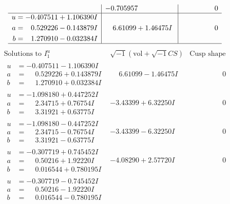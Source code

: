 \documentclass[1p]{elsarticle_modified}
\theoremstyle{definition}
\newcommand{\I}{\sqrt{-1}}
\begin{document}
$$\begin{array}{c|c|c}
 & -0.705957\phantom{ +0.000000I} & \phantom{-0.000000 } 0 \\ \hline\begin{aligned}
u &= -0.407511 + 1.106390 I \\
a &= \phantom{-}0.529226 - 0.143879 I \\
b &= \phantom{-}1.270910 - 0.032384 I\end{aligned}
 & \phantom{-}6.61099 + 1.46475 I & \phantom{-0.000000 } 0\\
 \hline 
 \end{array}$$\newpage$$\begin{array}{c|c|c}  
\text{Solutions to }I^u_{1}& \I (\text{vol} + \sqrt{-1}CS) & \text{Cusp shape}\\
 \hline 
\begin{aligned}
u &= -0.407511 - 1.106390 I \\
a &= \phantom{-}0.529226 + 0.143879 I \\
b &= \phantom{-}1.270910 + 0.032384 I\end{aligned}
 & \phantom{-}6.61099 - 1.46475 I & \phantom{-0.000000 } 0 \\ \hline\begin{aligned}
u &= -1.098180 + 0.447252 I \\
a &= \phantom{-}2.34715 + 0.76754 I \\
b &= \phantom{-}3.31921 + 0.63775 I\end{aligned}
 & -3.43399 + 6.32250 I & \phantom{-0.000000 } 0 \\ \hline\begin{aligned}
u &= -1.098180 - 0.447252 I \\
a &= \phantom{-}2.34715 - 0.76754 I \\
b &= \phantom{-}3.31921 - 0.63775 I\end{aligned}
 & -3.43399 - 6.32250 I & \phantom{-0.000000 } 0 \\ \hline\begin{aligned}
u &= -0.307719 + 0.745452 I \\
a &= \phantom{-}0.50216 + 1.92220 I \\
b &= \phantom{-}0.016544 + 0.780195 I\end{aligned}
 & -4.08290 + 2.57720 I & \phantom{-0.000000 } 0 \\ \hline\begin{aligned}
u &= -0.307719 - 0.745452 I \\
a &= \phantom{-}0.50216 - 1.92220 I \\
b &= \phantom{-}0.016544 - 0.780195 I\end{aligned}

\end{array}$$
\end{document}
